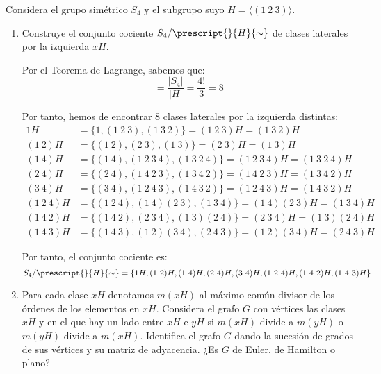 \begin{ejercicio}\label{ej:1.32}
    Considera el grupo simétrico $S_4$ y el subgrupo suyo $H = \langle (1\ 2\ 3) \rangle$.
    \begin{enumerate}
        \item Construye el conjunto cociente $S_4/\prescript{}{H}{\sim}$ de clases laterales por la izquierda $xH$.
        
        Por el Teorema de Lagrange, sabemos que:
        \begin{equation*}
            [S_4:H] = \frac{|S_4|}{|H|} = \frac{4!}{3} = 8
        \end{equation*}

        Por tanto, hemos de encontrar 8 clases laterales por la izquierda distintas:
        \begin{align*}
            1H &= \{1, (1\ 2\ 3), (1\ 3\ 2)\} = (1\ 2\ 3)H = (1\ 3\ 2)H\\
            (1\ 2)H &= \{(1\ 2), (2\ 3), (1\ 3)\} = (2\ 3)H = (1\ 3)H\\
            (1\ 4)H &= \{(1\ 4), (1\ 2\ 3\ 4), (1\ 3\ 2\ 4)\} = (1\ 2\ 3\ 4)H = (1\ 3\ 2\ 4)H\\
            (2\ 4)H &= \{(2\ 4), (1\ 4\ 2\ 3), (1\ 3\ 4\ 2)\} = (1\ 4\ 2\ 3)H = (1\ 3\ 4\ 2)H\\
            (3\ 4)H &= \{(3\ 4), (1\ 2\ 4\ 3), (1\ 4\ 3\ 2)\} = (1\ 2\ 4\ 3)H = (1\ 4\ 3\ 2)H\\
            (1\ 2\ 4)H &= \{(1\ 2\ 4), (1\ 4)(2\ 3), (1\ 3\ 4)\} = (1\ 4)(2\ 3)H = (1\ 3\ 4)H\\
            (1\ 4\ 2)H &= \{(1\ 4\ 2), (2\ 3\ 4), (1\ 3)(2\ 4)\} = (2\ 3\ 4)H = (1\ 3)(2\ 4)H\\
            (1\ 4\ 3)H &= \{(1\ 4\ 3), (1\ 2)(3\ 4), (2\ 4\ 3)\} = (1\ 2)(3\ 4)H = (2\ 4\ 3)H
        \end{align*}

        Por tanto, el conjunto cociente es:
        \begin{equation*}
            S_4/\prescript{}{H}{\sim} = \{1H, (1\ 2)H, (1\ 4)H, (2\ 4)H, (3\ 4)H, (1\ 2\ 4)H, (1\ 4\ 2)H, (1\ 4\ 3)H\}
        \end{equation*}
        \item Para cada clase $xH$ denotamos $m(xH)$ al máximo común divisor de los órdenes de los elementos en $xH$. Considera el grafo $G$ con vértices las clases $xH$ y en el que hay un lado entre $xH$ e $yH$ si $m(xH)$ divide a $m(yH)$ o $m(yH)$ divide a $m(xH)$. Identifica el grafo $G$ dando la sucesión de grados de sus vértices y su matriz de adyacencia. ¿Es $G$ de Euler, de Hamilton o plano?
        

\end{enumerate}
\end{ejercicio}
